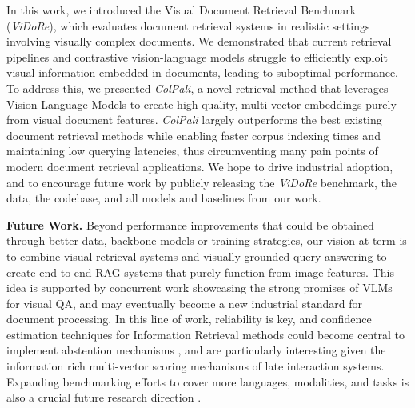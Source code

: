 \documentclass{article} %
\begin{document}
In this work, we introduced the Visual Document Retrieval Benchmark (\textit{ViDoRe}), which evaluates document retrieval systems in realistic settings involving visually complex documents. We demonstrated that current retrieval pipelines and contrastive vision-language models struggle to efficiently exploit visual information embedded in documents, leading to suboptimal performance. To address this, we presented \textit{ColPali}, a novel retrieval method that leverages Vision-Language Models to create high-quality, multi-vector embeddings purely from visual document features. \textit{ColPali} largely outperforms the best existing document retrieval methods while enabling faster corpus indexing times and maintaining low querying latencies, thus circumventing many pain points of modern document retrieval applications. We hope to drive industrial adoption, and to encourage future work by publicly releasing the \textit{ViDoRe} benchmark, the data, the codebase, and all models and baselines from our work.


\noindent\textbf{Future Work.} 
Beyond performance improvements that could be obtained through better data, backbone models or training strategies, our vision at term is to combine visual retrieval systems and visually grounded query answering to create end-to-end RAG systems that purely function from image features. This idea is supported by concurrent work \citep{ma2024mmlongbenchdocbenchmarkinglongcontextdocument} showcasing the strong promises of VLMs for visual QA, and may eventually become a new industrial standard for document processing. In this line of work, reliability is key, and confidence estimation techniques for Information Retrieval methods could become central to implement abstention mechanisms \citep{gisserotboukhlef2024trustworthyrerankingsimpleeffective}, and are particularly interesting given the information rich multi-vector scoring mechanisms of late interaction systems.
Expanding benchmarking efforts to cover more languages, modalities, and tasks is also a crucial future research direction \citep{jiang2024vlm2vectrainingvisionlanguagemodels}.
 
\end{document}
